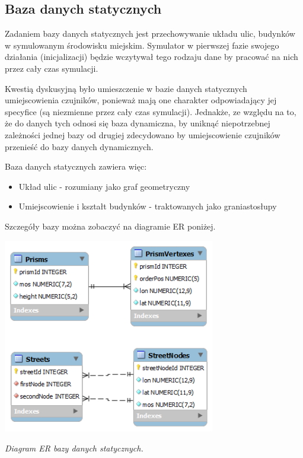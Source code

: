 {\subsection{Baza danych statycznych}
\par{
Zadaniem bazy danych statycznych jest przechowywanie układu ulic, budynków w symulowanym środowisku miejskim. Symulator w pierwszej fazie swojego działania (inicjalizacji) będzie wczytywał tego rodzaju dane by pracować na nich przez cały czas symulacji.
}
\par{
Kwestią dyskusyjną było umieszczenie w bazie danych statycznych umiejscowienia czujników, ponieważ mają one charakter odpowiadający jej specyfice (są niezmienne przez cały czas symulacji). Jednakże, ze względu na to, że do danych tych odnosi się baza dynamiczna, by uniknąć niepotrzebnej zależności jednej bazy od drugiej zdecydowano by umiejscowienie czujników przenieść do bazy danych dynamicznych.
}
\par{
Baza danych statycznych zawiera więc:
\begin{itemize}
\item Układ ulic - rozumiany jako graf geometryczny
\item Umiejscowienie i kształt budynków - traktowanych jako graniastosłupy
\end{itemize}
Szczegóły bazy można zobaczyć na diagramie ER poniżej.
}

\par{
\begin{center}
\includegraphics[width=25em]{img/static_db}
\end{center}
}
\par{
\begin{center}
\textit{Diagram ER bazy danych statycznych.}
\end{center}
}

}
